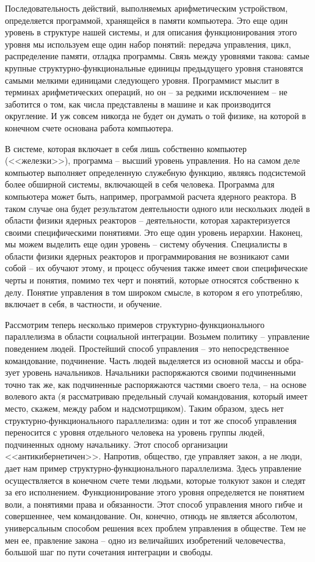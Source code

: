 \documentclass{book}
\begin{document}
Последовательность действий, выполняемых арифметическим устройством, определяется программой, хранящейся в памяти компьютера. Это еще один уровень в структуре нашей системы, и для описания функционирования этого уровня мы использу­ем еще один набор понятий: передача управления, цикл, распределение памяти, отладка программы. Связь между уровнями такова: самые крупные структурно-функциональные единицы предыдущего уровня становятся самыми мелкими единицами следующего уровня. Программист мыслит в терминах арифметических операций, но он -- за редкими исключением -- не заботится о том, как числа представлены в машине и как производится округление. И уж совсем никогда не будет он думать о той физике, на которой в конечном счете основана работа компьютера.

В системе, которая включает в себя лишь собственно компьютер (<<железки>>), программа -- высший уровень управления. Но на самом деле компьютер выполняет определенную служебную функцию, являясь подсистемой более обширной системы, включающей в себя человека. Программа для компьютера может быть, например, программой расчета ядерного реактора. В таком случае она будет результатом деятельности одного или нескольких людей в области физики ядерных реакторов -- деятельности, которая характеризуется своими спе­цифическими понятиями. Это еще один уровень иерархии. На­конец, мы можем выделить еще один уровень -- систему обу­чения. Специалисты в области физики ядерных реакторов и про­граммирования не возникают сами собой -- их обучают этому, и процесс обучения также имеет свои специфические черты и понятия, помимо тех черт и понятий, которые относятся собст­венно к делу. Понятие управления в том широком смысле, в котором я его употребляю, включает в себя, в частности, и обучение.

Рассмотрим теперь несколько примеров структурно-функ­ционального параллелизма в области социальной интеграции. Возьмем политику -- управление поведением людей. Простей­ший способ управления -- это непосредственное командование, подчинение. Часть людей выделяется из основной массы и обра­зует уровень начальников. Начальники распоряжаются своими подчиненными точно так же, как подчиненные распоряжаются частями своего тела, -- на основе волевого акта (я рассматри­ваю предельный случай командования, который имеет место, скажем, между рабом и надсмотрщиком). Таким образом, здесь нет структурно-функционального параллелизма: один и тот же способ управления переносится с уровня отдельного че­ловека на уровень группы людей, подчиненных одному началь­нику. Этот способ организации <<антикибернетичен>>. Напротив, общество, где управляет закон,  а не люди,  дает нам пример структурно-функционального параллелизма. Здесь управление осуществляется в конечном счете теми людьми, которые тол­куют закон и следят за его 
исполнением.
 Функционирование этого уровня определяется не понятием воли,  а понятиями права  и обязанности.  Этот способ управления много гибче и совер­шеннее, чем командование. Он, конечно, отнюдь не является абсолютом, универсальным способом решения всех проблем управления в обществе. Тем не мен ее, правление закона -- одно из величайших изобретений человечества, большой шаг по пу­ти сочетания интеграции и свободы.
\end{document}
